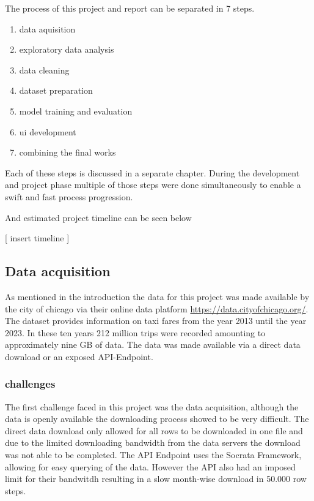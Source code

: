 \documentclass[
  letterpaper,
  DIV=11,
  numbers=noendperiod]{scrartcl}
\begin{document}
The process of this project and report can be separated in 7 steps.

\begin{enumerate}
\def\labelenumi{\arabic{enumi}.}
\item
  data aquisition
\item
  exploratory data analysis
\item
  data cleaning
\item
  dataset preparation
\item
  model training and evaluation
\item
  ui development
\item
  combining the final works
\end{enumerate}

Each of these steps is discussed in a separate chapter. During the
development and project phase multiple of those steps were done
simultaneously to enable a swift and fast process progression.

And estimated project timeline can be seen below

{[} insert timeline {]}

\newpage

\subsection{Data acquisition}\label{data-acquisition}

As mentioned in the introduction the data for this project was made
available by the city of chicago via their online data platform
\url{https://data.cityofchicago.org/}. The dataset provides information
on taxi fares from the year 2013 until the year 2023. In these ten years
212 million trips were recorded amounting to approximately nine GB of
data. The data was made available via a direct data download or an
exposed API-Endpoint.

\subsubsection{challenges}\label{challenges}

The first challenge faced in this project was the data acquisition,
although the data is openly available the downloading process showed to
be very difficult. The direct data download only allowed for all rows to
be downloaded in one file and due to the limited downloading bandwidth
from the data servers the download was not able to be completed. The API
Endpoint uses the Socrata Framework, allowing for easy querying of the
data. However the API also had an imposed limit for their bandwitdh
resulting in a slow month-wise download in 50.000 row steps.
\end{document}
